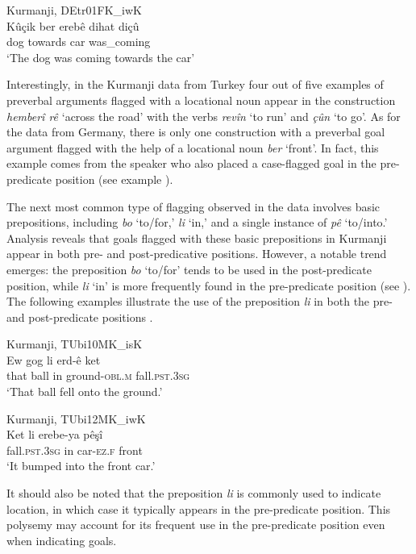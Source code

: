 \ea
  \label{ex:key:69} Kurmanji, DEtr01FK\_iwK \\
\gll Kûçik   ber     erebê   {dihat   diçû}\\
dog  towards  car  was\_coming\\
\glt ‘The dog was coming towards the car’
  \z

Interestingly, in the Kurmanji data from Turkey four out of five examples of preverbal arguments flagged with a locational noun appear in the construction \textit{hemberî rê} ‘across the road’ with the verbs \textit{revîn} ‘to run’ and \textit{çûn} ‘to go’. As for the data from Germany, there is only one construction with a preverbal goal argument flagged with the help of a locational noun \textit{ber} ‘front’. In fact, this example comes from the speaker who also placed a case-flagged goal in the pre-predicate position (see example ).

The next most common type of flagging observed in the data involves basic prepositions, including \textit{bo} ‘to/for,’ \textit{li} ‘in,’ and a single instance of \textit{pê} ‘to/into.’ Analysis reveals that goals flagged with these basic prepositions in Kurmanji appear in both pre- and post-predicative positions. However, a notable trend emerges: the preposition \textit{bo} ‘to/for’ tends to be used in the post-predicate position, while \textit{li} ‘in’ is more frequently found in the pre-predicate position (see ). The following examples illustrate the use of the preposition \textit{li} in both the pre-  and post-predicate positions .

\ea
  \label{ex:key:70} Kurmanji, TUbi10MK\_isK \\
     \gll Ew   gog   li   erd-ê     ket\\
that  ball  in  ground\textsc{-obl.m}  fall.\textsc{pst.3sg}  \\
\glt ‘That ball fell onto the ground.’ 
  \z

\ea
  \label{ex:key:71} Kurmanji, TUbi12MK\_iwK \\
     \gll Ket     li   erebe-ya   pêşî\\
fall.\textsc{pst.3sg}  in  car-\textsc{ez.f}  front\\
\glt ‘It bumped into the front car.’ 
  \z

It should also be noted that the preposition \textit{li} is commonly used to indicate location, in which case it typically appears in the pre-predicate position. This polysemy may account for its frequent use in the pre-predicate position even when indicating goals.


